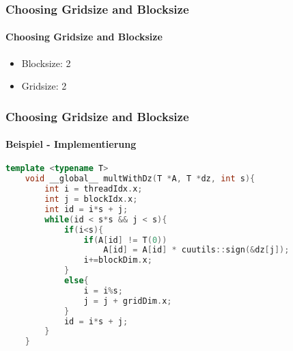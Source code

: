 \begin{frame}
	\frametitle{Choosing Gridsize and Blocksize}
	\framesubtitle{Choosing Gridsize and Blocksize}
	\begin{itemize}
		\item Blocksize: 2
		\item Gridsize: 2
	\end{itemize}
\end{frame}
\begin{frame}[fragile]
	\frametitle{Choosing Gridsize and Blocksize}
	\framesubtitle{Beispiel - Implementierung}
	\begin{lstlisting}[language=cpp]
	template <typename T>
	void __global__ multWithDz(T *A, T *dz, int s){
		int i = threadIdx.x;
		int j = blockIdx.x;
		int id = i*s + j;
		while(id < s*s && j < s){
			if(i<s){
				if(A[id] != T(0)) 
					A[id] = A[id] * cuutils::sign(&dz[j]);
				i+=blockDim.x;
			}
			else{
				i = i%s;
				j = j + gridDim.x;
			}
			id = i*s + j;
		}			
	}
	\end{lstlisting}
\end{frame}

